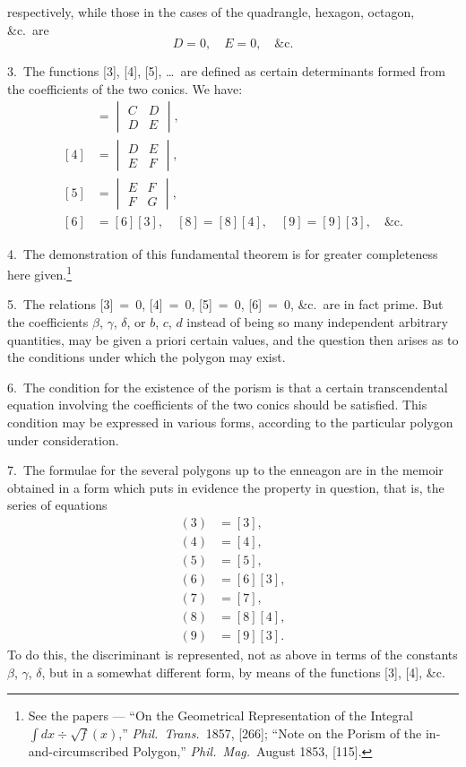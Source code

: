 \documentclass[11pt,a4paper]{article}
\theoremstyle{plain}
\theoremstyle{definition}
\theoremstyle{remark}
\begin{document}
respectively, while those in the cases of the quadrangle, hexagon, octagon, \&c.\ are
\[
D=0,\quad E=0,\quad \text{\&c.}
\]

\newpage
\setcounter{page}{311}

3.\ The functions [3], [4], [5], \dots\ are defined as certain determinants formed from the coefficients of the two conics. We have:
\begin{align*}
[3] &= \begin{vmatrix} C & D \\ D & E \end{vmatrix},\\
[4] &= \begin{vmatrix} D & E \\ E & F \end{vmatrix},\\
[5] &= \begin{vmatrix} E & F \\ F & G \end{vmatrix},\\
[6] &= [6][3],\quad [8]=[8][4],\quad [9]=[9][3],\quad \text{\&c.}
\end{align*}

4.\ The demonstration of this fundamental theorem is for greater completeness here given.\footnote{See the papers --- ``On the Geometrical Representation of the Integral $\int dx\div\surd f(x)$,'' \textit{Phil.\ Trans.}\ 1857, [266]; ``Note on the Porism of the in-and-circumscribed Polygon,'' \textit{Phil.\ Mag.}\ August 1853, [115].}

5.\ The relations [3]~=~0, [4]~=~0, [5]~=~0, [6]~=~0, \&c.\ are in fact prime. But the coefficients $\beta$, $\gamma$, $\delta$, or $b$, $c$, $d$ instead of being so many independent arbitrary quantities, may be given a priori certain values, and the question then arises as to the conditions under which the polygon may exist.

\newpage
\setcounter{page}{312}

6.\ The condition for the existence of the porism is that a certain transcendental equation involving the coefficients of the two conics should be satisfied. This condition may be expressed in various forms, according to the particular polygon under consideration.

7.\ The formulae for the several polygons up to the enneagon are in the memoir obtained in a form which puts in evidence the property in question, that is, the series of equations
\begin{align*}
(3) &= [3],\\
(4) &= [4],\\
(5) &= [5],\\
(6) &= [6][3],\\
(7) &= [7],\\
(8) &= [8][4],\\
(9) &= [9][3].
\end{align*}
To do this, the discriminant is represented, not as above in terms of the constants $\beta$, $\gamma$, $\delta$, but in a somewhat different form, by means of the functions [3], [4], \&c.
\end{document}
